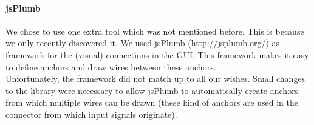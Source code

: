 \documentclass[a4paper]{article}
\begin{document}
\paragraph{jsPlumb}
We chose to use one extra tool which was not mentioned before. This is because we only recently discovered it. We used jsPlumb (\url{http://jsplumb.org/}) as framework for the (visual) connections in the GUI. This framework makes it easy to define anchors and draw wires between these anchors. \\
Unfortunately, the framework did not match up to all our wishes. Small changes to the library were necessary to allow jsPlumb to automatically create anchors from which multiple wires can be drawn (these kind of anchors are used in the connector from which input signals originate).
\end{document}
